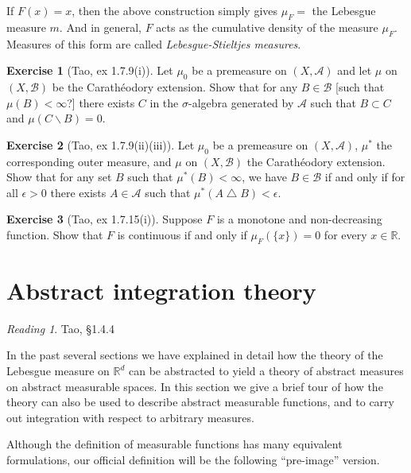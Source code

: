 \documentclass[10pt,oneside]{amsbook}
\renewcommand{\setminus}{\smallsetminus}
\renewcommand{\triangle}{\bigtriangleup}
\newcommand{\RR}{{\mathbb R}}
\theoremstyle{definition}
\newtheorem{exerc}{Exercise}[section]
\theoremstyle{plain}
\theoremstyle{definition}
\theoremstyle{remark}
\newtheorem*{reading}{Reading}
\numberwithin{equation}{section}
\numberwithin{figure}{section}
\begin{document}
If $F(x)=x$, then the above construction simply gives $\mu_F=$ the Lebesgue measure $m$. And in general, $F$ acts as the cumulative density of the measure $\mu_F$. Measures of this form are called \emph{Lebesgue-Stieltjes measures}.

\begin{exerc}[Tao, ex 1.7.9(i)]
  Let $\mu_0$ be a premeasure on $(X,\mathcal A)$ and let $\mu$ on $(X,\mathcal B)$ be the Carath\'eodory extension. Show that for any $B\in\mathcal B$ [such that $\mu(B)<\infty$?] there exists $C$ in the $\sigma$-algebra generated by $\mathcal A$ such that $B\subset C$ and $\mu(C\setminus B)=0$.
\end{exerc}

\begin{exerc}[Tao, ex 1.7.9(ii)(iii)]
  Let $\mu_0$ be a premeasure on $(X,\mathcal A)$, $\mu^*$ the corresponding outer measure, and $\mu$ on $(X,\mathcal B)$ the Carath\'eodory extension. Show that for any set $B$ such that $\mu^*(B)<\infty$, we have $B\in\mathcal B$ if and only if for all $\epsilon>0$ there exists $A\in\mathcal A$ such that $\mu^*(A\triangle B)<\epsilon$.
\end{exerc}

\begin{exerc}[Tao, ex 1.7.15(i)]
  Suppose $F$ is a monotone and non-decreasing function. Show that $F$ is continuous if and only if $\mu_F(\{x\})=0$ for every $x\in\RR$.
\end{exerc}

\newpage
\section{Abstract integration theory}

\begin{reading}
  Tao, \S 1.4.4
\end{reading}

In the past several sections we have explained in detail how the theory of the Lebesgue measure on $\RR^d$ can be abstracted to yield a theory of abstract measures on abstract measurable spaces. In this section we give a brief tour of how the theory can also be used to describe abstract measurable functions, and to carry out integration with respect to arbitrary measures.

Although the definition of measurable functions has many equivalent formulations, our official definition will be the following ``pre-image'' version.
\end{document}
